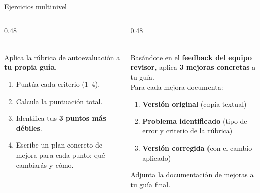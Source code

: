 \documentclass[aspectratio=169, 10pt, spanish]{beamer}
\begin{document}

\begin{frame}{Ejercicios multinivel}
  \begin{columns}[T]
    \begin{column}{0.48\textwidth}
      \begin{evaluarbox}
        \AlmFontFootnote{}\\[4pt]
        Aplica la rúbrica de autoevaluación
        a \textbf{tu propia guía}.\\[4pt]
        \begin{enumerate}
          \item Puntúa cada criterio (1--4).
          \item Calcula la puntuación total.
          \item Identifica tus \textbf{3 puntos más débiles}.
          \item Escribe un plan concreto de mejora
                para cada punto: qué cambiarás y cómo.
        \end{enumerate}
      \end{evaluarbox}
    \end{column}
    \begin{column}{0.48\textwidth}
      \begin{crearbox}
        \AlmFontFootnote{}\\[4pt]
        Basándote en el \textbf{feedback del equipo revisor},
        aplica \textbf{3 mejoras concretas} a tu guía.\\[4pt]
        Para cada mejora documenta:
        \begin{enumerate}
          \item \textbf{Versión original} (copia textual)
          \item \textbf{Problema identificado}
                (tipo de error y criterio de la rúbrica)
          \item \textbf{Versión corregida}
                (con el cambio aplicado)
        \end{enumerate}
        Adjunta la documentación de mejoras
        a tu guía final.
      \end{crearbox}
    \end{column}
  \end{columns}
\end{frame}
\end{document}
